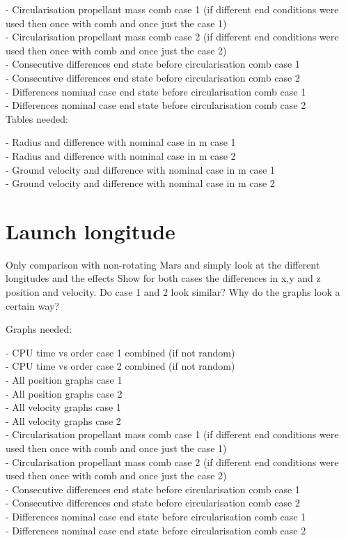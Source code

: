 - Circularisation propellant mass comb case 1 (if different end conditions were used then once with comb and once just the case 1) \\
- Circularisation propellant mass comb case 2 (if different end conditions were used then once with comb and once just the case 2) \\
- Consecutive differences end state before circularisation comb case 1 \\
- Consecutive differences end state before circularisation comb case 2 \\
- Differences nominal case end state before circularisation comb case 1 \\
- Differences nominal case end state before circularisation comb case 2 \\


Tables needed:

- Radius and difference with nominal case in m case 1 \\
- Radius and difference with nominal case in m case 2 \\
- Ground velocity and difference with nominal case in m case 1 \\
- Ground velocity and difference with nominal case in m case 2 \\
 


\section{Launch longitude}
\label{sec:launchLongitude}

Only comparison with non-rotating Mars and simply look at the different longitudes and the effects
Show for both cases the differences in x,y and z position and velocity. Do case 1 and 2 look similar? Why do the graphs look a certain way?

Graphs needed:

- CPU time vs order case 1 combined (if not random) \\
- CPU time vs order case 2 combined (if not random) \\
- All position graphs case 1 \\
- All position graphs case 2 \\
- All velocity graphs case 1 \\
- All velocity graphs case 2 \\

- Circularisation propellant mass comb case 1 (if different end conditions were used then once with comb and once just the case 1) \\
- Circularisation propellant mass comb case 2 (if different end conditions were used then once with comb and once just the case 2) \\
- Consecutive differences end state before circularisation comb case 1 \\
- Consecutive differences end state before circularisation comb case 2 \\
- Differences nominal case end state before circularisation comb case 1 \\
- Differences nominal case end state before circularisation comb case 2 \\



